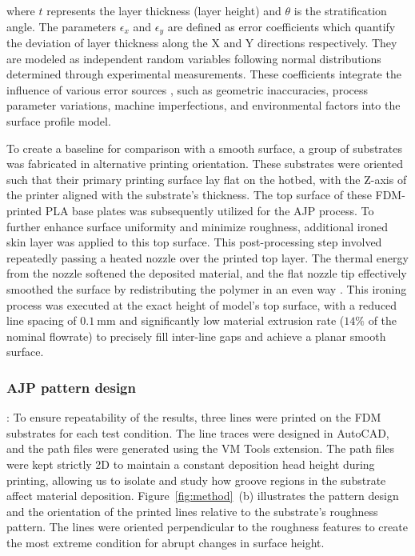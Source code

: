 \documentclass[subscriptcorrection,upint,varvw,balance,hyphenate]{asmejour}
\begin{document}
where $t$ represents the layer thickness (layer height) and $\theta$ is the stratification angle. The parameters $\epsilon_x$ and $\epsilon_y$ are defined as error coefficients which quantify the deviation of layer thickness along the X and Y directions respectively. They are modeled as independent random variables following normal distributions determined through experimental measurements. These coefficients integrate the influence of various error sources \cite{ahn2009representation}, such as geometric inaccuracies, process parameter variations, machine imperfections, and environmental factors into the surface profile model.

 


To create a baseline for comparison with a smooth surface, a group of substrates was fabricated in alternative printing orientation. These substrates were oriented such that their primary printing surface lay flat on the hotbed, with the Z-axis of the printer aligned with the substrate's thickness. The top surface of these FDM-printed PLA base plates was subsequently utilized for the AJP process. To further enhance surface uniformity and minimize roughness, additional ironed skin layer was applied to this top surface. This post-processing step involved repeatedly passing a heated nozzle over the printed top layer. The thermal energy from the nozzle softened the deposited material, and the flat nozzle tip effectively smoothed the surface by redistributing the polymer in an even way \cite{alzyod2023ironing}. This ironing process was executed at the exact height of model's top surface, with a reduced line spacing of $0.1~\mathrm{mm}$ and significantly low material extrusion rate ($14\%$ of the nominal flowrate) \cite{benno2024ironing} to precisely fill inter-line gaps and achieve a planar smooth surface.

\subsubsection{AJP pattern design}: 
To ensure repeatability of the results, three lines were printed on the FDM substrates for each test condition. The line traces were designed in AutoCAD, and the path files were generated using the VM Tools extension. The path files were kept strictly 2D to maintain a constant deposition head height during printing, allowing us to isolate and study how groove regions in the substrate affect material deposition. Figure~\ref{fig:method}~(b) illustrates the pattern design and the orientation of the printed lines relative to the substrate's roughness pattern. The lines were oriented perpendicular to the roughness features to create the most extreme condition for abrupt changes in surface height.
\end{document}
